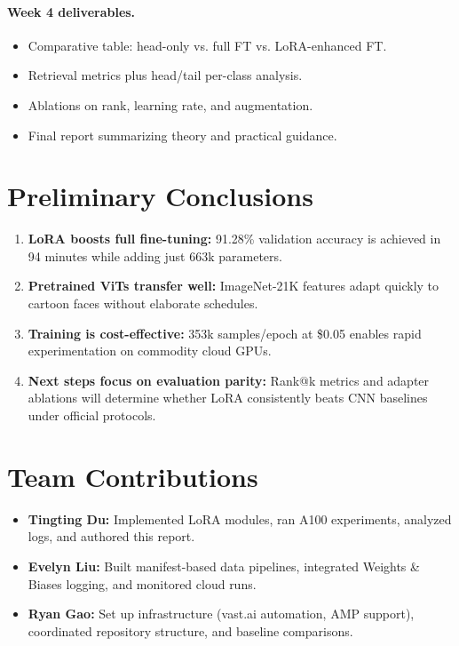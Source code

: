 \documentclass[11pt]{article}
\begin{document}
\paragraph{Week 4 deliverables.}
\begin{itemize}
    \item Comparative table: head-only vs. full FT vs. LoRA-enhanced FT.
    \item Retrieval metrics plus head/tail per-class analysis.
    \item Ablations on rank, learning rate, and augmentation.
    \item Final report summarizing theory and practical guidance.
\end{itemize}

\section{Preliminary Conclusions}

\begin{enumerate}
    \item \textbf{LoRA boosts full fine-tuning:} 91.28\% validation accuracy is achieved in 94 minutes while adding just 663k parameters.
    \item \textbf{Pretrained ViTs transfer well:} ImageNet-21K features adapt quickly to cartoon faces without elaborate schedules.
    \item \textbf{Training is cost-effective:} 353k samples/epoch at \$0.05 enables rapid experimentation on commodity cloud GPUs.
    \item \textbf{Next steps focus on evaluation parity:} Rank@k metrics and adapter ablations will determine whether LoRA consistently beats CNN baselines under official protocols.
\end{enumerate}

\section*{Team Contributions}

\begin{itemize}
    \item \textbf{Tingting Du:} Implemented LoRA modules, ran A100 experiments, analyzed logs, and authored this report.
    \item \textbf{Evelyn Liu:} Built manifest-based data pipelines, integrated Weights \& Biases logging, and monitored cloud runs.
    \item \textbf{Ryan Gao:} Set up infrastructure (vast.ai automation, AMP support), coordinated repository structure, and baseline comparisons.
\end{itemize}
\end{document}
